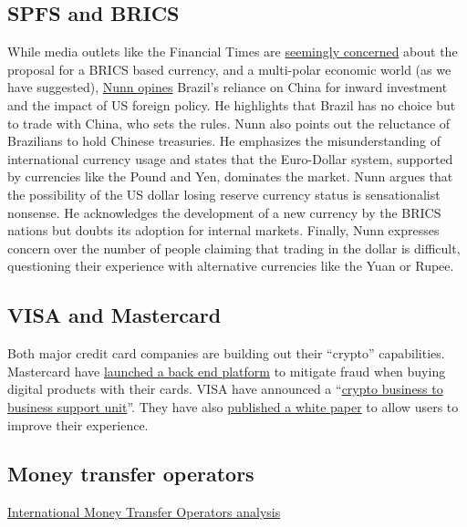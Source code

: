 \subsection{SPFS and BRICS}
While media outlets like the Financial Times are \href{https://www.ft.com/content/f8f3b2cd-6690-4f26-b81e-e972751c8799}{seemingly concerned} about the proposal for a BRICS based currency, and a multi-polar economic world (as we have suggested), \href{https://twitter.com/robfnunn/status/1641743274997055490}{Nunn opines} Brazil's reliance on China for inward investment and the impact of US foreign policy. He highlights that Brazil has no choice but to trade with China, who sets the rules. Nunn also points out the reluctance of Brazilians to hold Chinese treasuries. He emphasizes the misunderstanding of international currency usage and states that the Euro-Dollar system, supported by currencies like the Pound and Yen, dominates the market. Nunn argues that the possibility of the US dollar losing reserve currency status is sensationalist nonsense. He acknowledges the development of a new currency by the BRICS nations but doubts its adoption for internal markets. Finally, Nunn expresses concern over the number of people claiming that trading in the dollar is difficult, questioning their experience with alternative currencies like the Yuan or Rupee.
\subsection{VISA and Mastercard}
Both major credit card companies are building out their ``crypto'' capabilities. Mastercard have \href{https://finance.yahoo.com/news/mastercard-crypto-secure-200559003.html}{launched a back end platform} to mitigate fraud when buying digital products with their cards. VISA have announced a ``\href{https://investor.visa.com/news/news-details/2021/Visa-Introduces-Crypto-Advisory-Services-to-Help-Partners-Navigate-a-New-Era-of-Money-Movement/default.aspx}{crypto business to business support unit}''. They have also \href{https://usa.visa.com/solutions/crypto/auto-payments-for-self-custodial-wallets.html}{published a white paper} to allow users to improve their experience.
\subsection{Money transfer operators}

\href{https://www.toptal.com/finance/market-research-analysts/international-money-transfer}{International Money Transfer Operators analysis}

